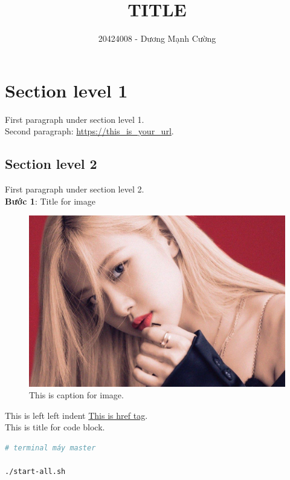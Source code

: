\documentclass[12pt]{article}
\title{\textbf{TITLE}}
\author{20424008 - Dương Mạnh Cường}
\newcommand{\lleftIndent}{\setlength{\parindent}{1.2cm}}
\begin{document}
\maketitle

\tableofcontents

\section{Section level 1}
First paragraph under section level 1.\\

\indent Second paragraph: \url{https://this_is_your_url}.

\subsection{Section level 2}
First paragraph under section level 2.\\

\textbf{Bước 1}: Title for image
\begin{figure}[H]
  \centering
  \includegraphics[width=\textwidth]{./images/sample.png}
  \caption{This is caption for image.}
\end{figure}

\lleftIndent This is left left indent \href{https://medium.com/@jootorres_11979/how-to-set-up-a-hadoop-3-2-1-multi-node-cluster-on-ubuntu-18-04-2-nodes-567ca44a3b12}{This is href tag}.\\

\lleftIndent This is title for code block.
\begin{lstlisting}[language=bash]
# terminal máy master

./start-all.sh
\end{lstlisting}
\end{document}
